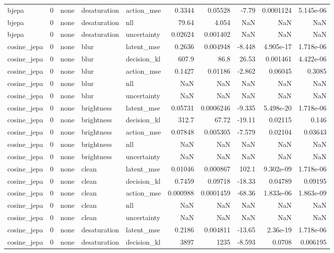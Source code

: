 \begin{tabular}{lrlllrrrrr}
bjepa & 0 & none & desaturation & action\_mse & 0.3344 & 0.05528 & -7.79 & 0.0001124 & 5.145e-06 \\
bjepa & 0 & none & desaturation & nll & 79.64 & 4.054 & NaN & NaN & NaN \\
bjepa & 0 & none & desaturation & uncertainty & 0.02624 & 0.001402 & NaN & NaN & NaN \\
cosine\_jepa & 0 & none & blur & latent\_mse & 0.2636 & 0.004948 & -8.448 & 4.905e-17 & 1.718e-06 \\
cosine\_jepa & 0 & none & blur & decision\_kl & 607.9 & 86.8 & 26.53 & 0.001461 & 4.422e-06 \\
cosine\_jepa & 0 & none & blur & action\_mse & 0.1427 & 0.01186 & -2.862 & 0.06045 & 0.3085 \\
cosine\_jepa & 0 & none & blur & nll & NaN & NaN & NaN & NaN & NaN \\
cosine\_jepa & 0 & none & blur & uncertainty & NaN & NaN & NaN & NaN & NaN \\
cosine\_jepa & 0 & none & brightness & latent\_mse & 0.05731 & 0.0006246 & -9.335 & 5.498e-20 & 1.718e-06 \\
cosine\_jepa & 0 & none & brightness & decision\_kl & 312.7 & 67.72 & -19.11 & 0.02115 & 0.146 \\
cosine\_jepa & 0 & none & brightness & action\_mse & 0.07848 & 0.005305 & -7.579 & 0.02104 & 0.03643 \\
cosine\_jepa & 0 & none & brightness & nll & NaN & NaN & NaN & NaN & NaN \\
cosine\_jepa & 0 & none & brightness & uncertainty & NaN & NaN & NaN & NaN & NaN \\
cosine\_jepa & 0 & none & clean & latent\_mse & 0.01046 & 0.000867 & 102.1 & 9.302e-09 & 1.718e-06 \\
cosine\_jepa & 0 & none & clean & decision\_kl & 0.7459 & 0.09718 & -18.33 & 0.04789 & 0.09195 \\
cosine\_jepa & 0 & none & clean & action\_mse & 0.000988 & 0.0001459 & -68.36 & 1.833e-06 & 1.863e-09 \\
cosine\_jepa & 0 & none & clean & nll & NaN & NaN & NaN & NaN & NaN \\
cosine\_jepa & 0 & none & clean & uncertainty & NaN & NaN & NaN & NaN & NaN \\
cosine\_jepa & 0 & none & desaturation & latent\_mse & 0.2186 & 0.004811 & -13.65 & 2.36e-19 & 1.718e-06 \\
cosine\_jepa & 0 & none & desaturation & decision\_kl & 3897 & 1235 & -8.593 & 0.0708 & 0.006195 \\

\end{tabular}
